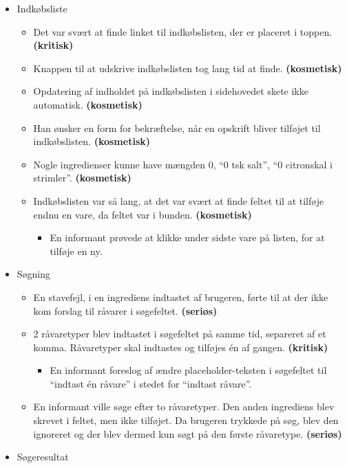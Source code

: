 \begin{itemize}[noitemsep]
 \item Indkøbsliste
  \begin{itemize}[noitemsep]
  \item Det var svært at finde linket til indkøbslisten, der er placeret i toppen. \textbf{(kritisk)}
  \item Knappen til at udskrive indkøbslisten tog lang tid at finde.  \textbf{(kosmetisk)}
  \item Opdatering af indholdet på indkøbslisten i sidehovedet skete ikke automatisk. \textbf{(kosmetisk)}
  \item Han ønsker en form for bekræftelse, når en opskrift bliver tilføjet til indkøbslisten. \textbf{(kosmetisk)}
  \item Nogle ingredienser kunne have mængden 0, \fx “0 tsk salt”, “0 citronskal i strimler”. \textbf{(kosmetisk)}
  \item Indkøbslisten var så lang, at det var svært at finde feltet til at tilføje endnu en vare, da feltet var i bunden.  \textbf{(kosmetisk)}
   \begin{itemize}[noitemsep]
   \item En informant prøvede at klikke under sidste vare på listen, for at tilføje en ny.
   \end{itemize}
  \end{itemize}
 \item Søgning
  \begin{itemize}[noitemsep]
  \item En stavefejl, i en ingrediens indtastet af brugeren, førte til at der ikke kom forslag til råvarer i søgefeltet.  \textbf{(seriøs)}
  \item 2 råvaretyper blev indtastet i søgefeltet på samme tid, separeret af et komma. Råvaretyper skal indtastes og tilføjes én af gangen. \textbf{(kritisk)}
   \begin{itemize}[noitemsep]
   \item En informant foreslog af ændre placeholder-teksten i søgefeltet til ``indtast én råvare'' i stedet for ``indtast råvare''.
   \end{itemize}
  \item En informant ville søge efter to råvaretyper. Den anden ingrediens blev skrevet i feltet, men ikke tilføjet. Da brugeren trykkede på søg, blev den ignoreret og der blev dermed kun søgt på den første råvaretype. \textbf{(seriøs)}
  \end{itemize}
 \item Søgeresultat

\end{itemize}
